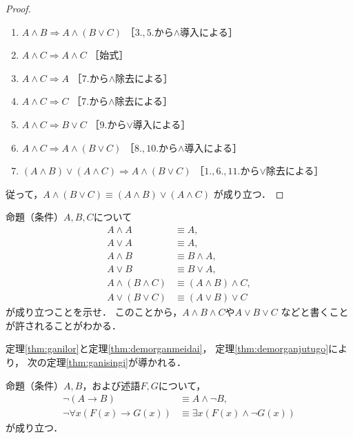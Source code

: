 \begin{proof}
\begin{enumerate}[1. ]
       \item $A \land B \Longrightarrow A \land ( B \lor C)$
              \quad ［$3., 5.$から$\land$導入による］
       \item $A \land C \Longrightarrow A \land C$ \quad ［始式］
       \item $A \land C \Longrightarrow A$ \quad ［7.から$\land$除去による］
       \item $A \land C \Longrightarrow C$ \quad ［7.から$\land$除去による］
       \item $A \land C \Longrightarrow B \lor C$ \quad ［9.から$\lor$導入による］
       \item $A \land C \Longrightarrow A \land ( B \lor C )$
              \quad ［$8., 10.$から$\land$導入による］
       \item $(A \land B) \lor ( A \land C) \Longrightarrow A \land (B \lor C)$
              \quad ［$1., 6., 11.$から$\lor$除去による］
     \end{enumerate}
     従って，$A \land (B \lor C) \equiv (A \land B) \lor (A \land C)$
     が成り立つ．
   \end{proof}
   \begin{que} \label{que:meidaiketugouritu}
     命題（条件）$A,  B,  C$について
     \begin{align}
       A \land A & \equiv A ,
       \label{eq:bekiland} \\
       A \lor A & \equiv A,
       \label{eq:bekilor} \\
       A \land B & \equiv B \land A,
       \label{eq:landkoukan} \\
       A \lor B & \equiv B \lor A ,
       \label{eq:lorkoukan} \\
       A \land ( B \land C) & \equiv (A \land B ) \land C ,
       \label{eq:landketugouritu} \\
       A \lor ( B \lor C) & \equiv ( A \lor B ) \lor C
       \label{eq:lorketugouritu}
     \end{align}
     が成り立つことを示せ．
     このことから，$A \land B \land C$や$A \lor B \lor C$
     などと書くことが許されることがわかる．
   \end{que}
   定理\ref{thm:ganilor}と定理\ref{thm:demorganmeidai}，
   定理\ref{thm:demorganjutugo}により，
   次の定理\ref{thm:ganisingi}が導かれる．
   \begin{thm} \label{thm:ganisingi}
     命題（条件）$A,  B$，および述語$F,  G$について，
     \begin{align}
       \lnot ( A \to B ) & \equiv A \land \lnot B,
       \label{eq:ganisingi} \\
       \lnot \forall x ( F(x) \to G(x) ) 
       & \equiv \exists x ( F(x) \land \lnot G(x) )
       \label{eq:ganisingijutugo}
     \end{align}
     が成り立つ．
   \end{thm}
